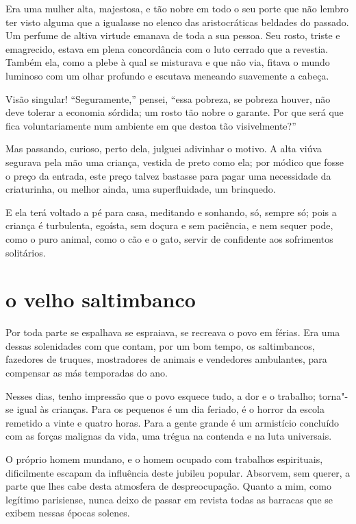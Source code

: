 Era uma mulher alta, majestosa, e tão nobre em todo o seu porte que não
lembro ter visto alguma que a igualasse no elenco das
aristocráticas beldades do passado. Um perfume de altiva virtude
emanava de toda a sua pessoa. Seu rosto, triste e emagrecido, estava em
plena concordância com o luto cerrado que a revestia. Também ela,
como a plebe à qual se misturava e que não via, fitava o mundo
luminoso com um olhar profundo e escutava meneando suavemente a
cabeça.

Visão singular! “Seguramente,'' pensei, “essa pobreza,
se pobreza houver, não deve tolerar a economia sórdida; um rosto tão
nobre o garante. Por que será que fica voluntariamente num ambiente em
que destoa tão visivelmente?''

Mas passando, curioso, perto dela, julguei adivinhar o motivo. A alta
viúva segurava pela mão uma criança, vestida de preto como ela; por
módico que fosse o preço da entrada, este preço talvez bastasse para
pagar uma necessidade da criaturinha, ou melhor ainda, uma
superfluidade, um brinquedo.

E ela terá voltado a pé para casa, meditando e sonhando, só, sempre só;
pois a criança é turbulenta, egoísta, sem doçura e sem paciência, e nem
sequer pode, como o puro animal, como o cão e o gato, servir de
confidente aos sofrimentos solitários.

\quebra\section[O velho saltimbanco]{o velho saltimbanco}

Por toda parte se espalhava se espraiava, se recreava o povo em férias.
Era uma dessas solenidades com que contam, por um bom tempo, os
saltimbancos, fazedores de truques, mostradores de animais e 
vendedores ambulantes, para compensar as más temporadas do ano.

Nesses dias, tenho impressão que o povo esquece tudo, a dor e o trabalho;
torna"-se igual às crianças. Para os pequenos é um dia feriado, é o
horror da escola remetido a vinte e quatro horas. Para a gente grande é
um armistício concluído com as forças malignas da vida, uma trégua na
contenda e na luta universais.

O próprio homem mundano, e o homem ocupado com trabalhos espirituais, dificilmente escapam da influência deste jubileu popular. 
Absorvem, sem querer, a parte que lhes cabe desta atmosfera de
despreocupação. Quanto a mim, como legítimo parisiense, nunca deixo
de passar em revista todas as barracas que se exibem nessas épocas
solenes.

